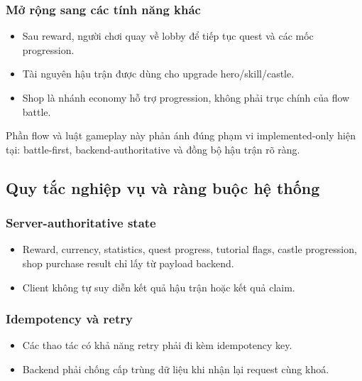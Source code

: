 \subsubsection{Mở rộng sang các tính năng khác}
\label{subsubsec:analysis_gameplay_feature_handoff}
\begin{itemize}
    \item Sau reward, người chơi quay về lobby để tiếp tục quest và các mốc progression.
    \item Tài nguyên hậu trận được dùng cho upgrade hero/\allowbreak skill/\allowbreak castle.
    \item Shop là nhánh economy hỗ trợ progression, không phải trục chính của flow battle.
\end{itemize}

Phần flow và luật gameplay này phản ánh đúng phạm vi implemented-only hiện tại: battle-first, backend-authoritative và đồng bộ hậu trận rõ ràng.

\subsection{Quy tắc nghiệp vụ và ràng buộc hệ thống}
\label{subsec:analysis_rules}

\subsubsection{Server-authoritative state}
\label{subsec:analysis_rules_authority}
\begin{itemize}
    \item Reward, currency, statistics, quest progress, tutorial flags, castle progression, shop purchase result chỉ lấy từ payload backend.
    \item Client không tự suy diễn kết quả hậu trận hoặc kết quả claim.
\end{itemize}

\subsubsection{Idempotency và retry}
\label{subsec:analysis_rules_idempotency}
\begin{itemize}
    \item Các thao tác có khả năng retry phải đi kèm idempotency key.
    \item Backend phải chống cấp trùng dữ liệu khi nhận lại request cùng khoá.
\end{itemize}

